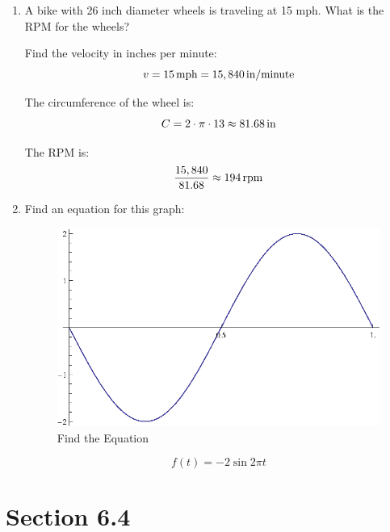 \documentclass{exam}
\begin{document}
  \begin{enumerate}
    \item A bike with 26 inch diameter wheels is traveling at 15 mph.  What is the RPM for the wheels?
      \begin{solution}
        Find the velocity in inches per minute:
        \[
          v = \unit[15]{mph} = \unit[15,840]{in/minute}
        \]

        The circumference of the wheel is:
        \[
          C = 2 \cdot \pi \cdot 13 \approx \unit[81.68]{in}
        \]

        The RPM is:
        \[
          \frac{15,840}{81.68} \approx \unit[194]{rpm}
        \]

      \end{solution}

      \ifprintanswers
        \pagebreak
      \fi

    \item Find an equation for this graph:
      \begin{figure}[h]
        \centering
        \includegraphics[scale=0.7]{review.eps}
        \caption{Find the Equation}
      \end{figure}

      \begin{solution}
        \[
          f(t) = -2 \sin 2 \pi t
        \]
      \end{solution}

  \end{enumerate}
  
  \ifprintanswers

    \section{Section 6.4}
\end{document}
